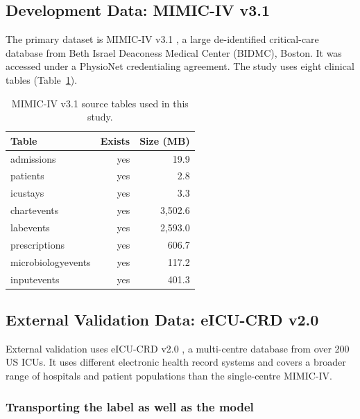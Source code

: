 \subsection{Development Data: MIMIC-IV v3.1}

The primary dataset is MIMIC-IV v3.1 \cite{johnson2023mimiciv,johnson2023mimiciv_scidata,pollard2026physionet}, a large
de-identified critical-care database from Beth Israel Deaconess Medical Center
(BIDMC), Boston. It was accessed under a PhysioNet credentialing agreement. The
study uses eight clinical tables (Table~\ref{tab:data_sources}).

\begin{table}[H]
    \centering
    \begin{tabular}{lrr}
        \toprule
        \textbf{Table}     & \textbf{Exists} & \textbf{Size (MB)} \\
        \midrule
        admissions         & yes             & 19.9               \\
        patients           & yes             & 2.8                \\
        icustays           & yes             & 3.3                \\
        chartevents        & yes             & 3,502.6            \\
        labevents          & yes             & 2,593.0            \\
        prescriptions      & yes             & 606.7              \\
        microbiologyevents & yes             & 117.2              \\
        inputevents        & yes             & 401.3              \\
        \bottomrule
    \end{tabular}
    \caption{MIMIC-IV v3.1 source tables used in this study.}
    \label{tab:data_sources}
\end{table}

\subsection{External Validation Data: eICU-CRD v2.0}

External validation uses eICU-CRD v2.0 \cite{pollard2018eicu}, a
multi-centre database from over 200 US ICUs. It uses different electronic health
record systems and covers a broader range of hospitals and patient populations
than the single-centre MIMIC-IV.

\subsubsection{Transporting the label as well as the model}
\label{sec:label_transport}

